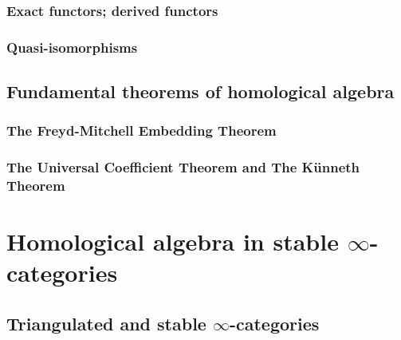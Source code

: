             \subsubsection{Exact functors; derived functors}
            
            \subsubsection{Quasi-isomorphisms}
        
        \subsection{Fundamental theorems of homological algebra}
            \subsubsection{The Freyd-Mitchell Embedding Theorem}
            
            \subsubsection{The Universal Coefficient Theorem and The K\"unneth Theorem}
    
    \section{Homological algebra in stable \texorpdfstring{$\infty$}{}-categories} \label{section: homological_algebra}
        \subsection{Triangulated and stable \texorpdfstring{$\infty$}{}-categories}
